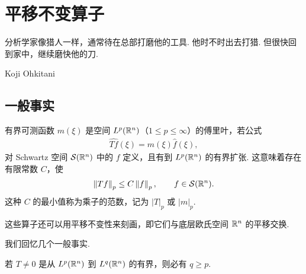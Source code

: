 
\chapter{平移不变算子}

\epigraph{分析学家像猎人一样，通常待在总部打磨他的工具. 他时不时出去打猎. 但很快回到家中，继续磨快他的刀.}{Koji Ohkitani}

\section{一般事实}

有界可测函数 $m(\xi)$ 是空间 $L^p(\mathbb{R}^n)$（$1 \leq p \leq \infty$）的傅里叶，若公式
\begin{align*}
  \widehat{T f}(\xi)=m(\xi)\widehat{f}(\xi),
\end{align*}
对 Schwartz 空间 $\mathcal{S}(\mathbb{R}^n)$ 中的 $f$ 定义，且有到 $L^p(\mathbb{R}^n)$ 的有界扩张. 这意味着存在有限常数 $C$，使
\begin{align*}
  \left\|T f\right\|_{p}\leq C\left\|f\right\|_{p},\qquad f\in\mathcal{S}(\mathbb{R}^{n}).
\end{align*}
这种 $C$ 的最小值称为乘子的范数，记为 $|T|_{p}$ 或 $|m|_{p}$.

这些算子还可以用平移不变性来刻画，即它们与底层欧氏空间 $\mathbb{R}^{n}$ 的平移交换.

我们回忆几个一般事实.

\begin{fact}\label{fact:4.1}
若 $T \neq 0$ 是从 $L^p(\mathbb{R}^n)$ 到 $L^q(\mathbb{R}^n)$ 的有界，则必有 $q \geq p$.
\end{fact}

